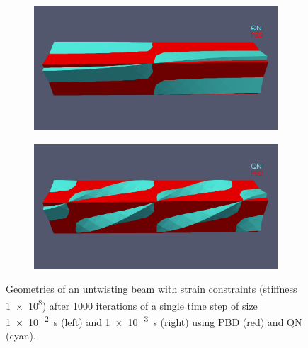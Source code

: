 \begin{figure}[b]
    \begin{subfigure}{0.44\textwidth}
    \includegraphics[width=\textwidth, trim={0 5.0cm 0 2.5cm}, clip]{figures/strain_pbd_1e-2.png}
    \end{subfigure}
    \hfill
    \begin{subfigure}{0.44\textwidth}
    \includegraphics[width=\textwidth, trim={0 5.0cm 0 2.5cm}, clip]{figures/strain_pbd_1e-3.png}
    \end{subfigure}
    \caption{Geometries of an untwisting beam with strain constraints (stiffness \num{1e8}) after 1000 iterations of a single time step of size \SI{1e-2}{\second} (left) 
    and \SI{1e-3}{\second} (right) using PBD (red) and QN (cyan).}
    \label{fig:strain-pbd}
\end{figure}

